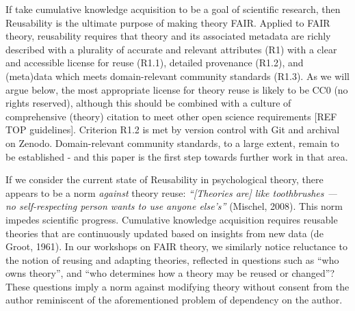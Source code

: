 \documentclass[
  man,floatsintext]{apa6}
\begin{document}
If take cumulative knowledge acquisition to be a goal of scientific research, then Reusability is the ultimate purpose of making theory FAIR.
Applied to FAIR theory, reusability requires that theory and its associated metadata are richly described with a plurality of accurate and relevant attributes (R1) with a clear and accessible license for reuse (R1.1), detailed provenance (R1.2), and (meta)data which meets domain-relevant community standards (R1.3).
As we will argue below, the most appropriate license for theory reuse is likely to be CC0 (no rights reserved),
although this should be combined with a culture of comprehensive (theory) citation to meet other open science requirements {[}REF TOP guidelines{]}.
Criterion R1.2 is met by version control with Git and archival on Zenodo.
Domain-relevant community standards, to a large extent, remain to be established - and this paper is the first step towards further work in that area.

If we consider the current state of Reusability in psychological theory, there appears to be a norm \emph{against} theory reuse:
\emph{``{[}Theories are{]} like toothbrushes --- no self-respecting person wants to use anyone else's''} (Mischel, 2008).
This norm impedes scientific progress.
Cumulative knowledge acquisition requires reusable theories that are continuously updated based on insights from new data (de Groot, 1961).
In our workshops on FAIR theory, we similarly notice reluctance to the notion of reusing and adapting theories,
reflected in questions such as ``who owns theory'',
and ``who determines how a theory may be reused or changed''?
These questions imply a norm against modifying theory without consent from the author reminiscent of the aforementioned problem of dependency on the author.
\end{document}
